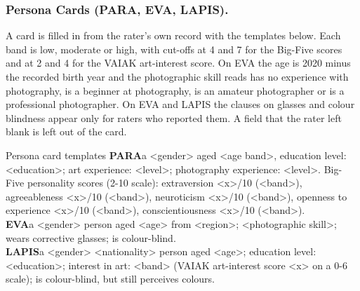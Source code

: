 \documentclass[runningheads]{llncs}
\newcommand{\pt}[1]{{\ttfamily\footnotesize #1}}
\begin{document}
\subsubsection{Persona Cards (PARA, EVA, LAPIS).} A card is filled in from the rater's own record with the templates below. Each band is low, moderate or high, with cut-offs at 4 and 7 for the Big-Five scores and at 2 and 4 for the VAIAK art-interest score. On EVA the age is 2020 minus the recorded birth year and the photographic skill reads \pt{has no experience with photography}, \pt{is a beginner at photography}, \pt{is an amateur photographer} or \pt{is a professional photographer}. On EVA and LAPIS the clauses on glasses and colour blindness appear only for raters who reported them. A field that the rater left blank is left out of the card.
\begin{promptbox}{Persona card templates}
\ttfamily
{\rmfamily\bfseries PARA}\quad a <gender> aged <age band>, education level: <education>; art experience: <level>; photography experience: <level>. Big-Five personality scores (2-10 scale): extraversion <x>/10 (<band>), agreeableness <x>/10 (<band>), neuroticism <x>/10 (<band>), openness to experience <x>/10 (<band>), conscientiousness <x>/10 (<band>).\\[4pt]
{\rmfamily\bfseries EVA}\quad a <gender> person aged <age> from <region>; <photographic skill>; wears corrective glasses; is colour-blind.\\[4pt]
{\rmfamily\bfseries LAPIS}\quad a <gender> <nationality> person aged <age>; education level: <education>; interest in art: <band> (VAIAK art-interest score <x> on a 0-6 scale); is colour-blind, but still perceives colours.
\end{promptbox}
\end{document}
